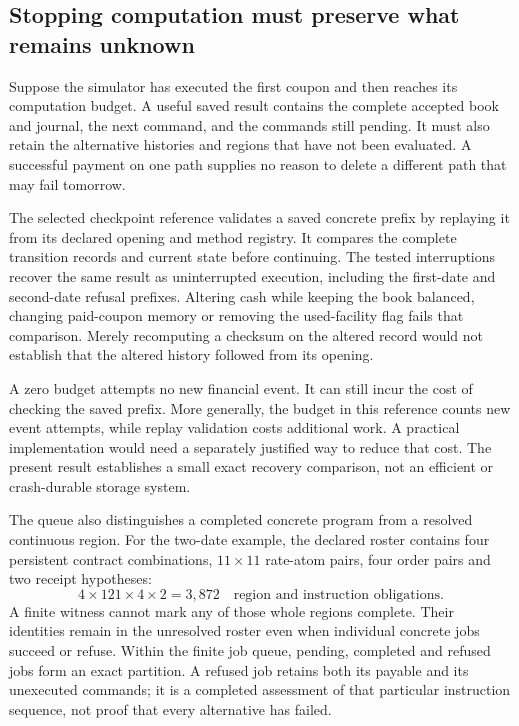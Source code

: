 \subsection{Stopping computation must preserve what remains unknown}

Suppose the simulator has executed the first coupon and then reaches its computation budget. A useful saved result contains the complete accepted book and journal, the next command, and the commands still pending. It must also retain the alternative histories and regions that have not been evaluated. A successful payment on one path supplies no reason to delete a different path that may fail tomorrow.

The selected checkpoint reference validates a saved concrete prefix by replaying it from its declared opening and method registry. It compares the complete transition records and current state before continuing. The tested interruptions recover the same result as uninterrupted execution, including the first-date and second-date refusal prefixes. Altering cash while keeping the book balanced, changing paid-coupon memory or removing the used-facility flag fails that comparison. Merely recomputing a checksum on the altered record would not establish that the altered history followed from its opening.

A zero budget attempts no new financial event. It can still incur the cost of checking the saved prefix. More generally, the budget in this reference counts new event attempts, while replay validation costs additional work. A practical implementation would need a separately justified way to reduce that cost. The present result establishes a small exact recovery comparison, not an efficient or crash-durable storage system.

The queue also distinguishes a completed concrete program from a resolved continuous region. For the two-date example, the declared roster contains four persistent contract combinations, $11\times11$ rate-atom pairs, four order pairs and two receipt hypotheses:
\begin{equation}
 4\times121\times4\times2=3{,}872
 \quad\text{region and instruction obligations}.
\end{equation}
A finite witness cannot mark any of those whole regions complete. Their identities remain in the unresolved roster even when individual concrete jobs succeed or refuse. Within the finite job queue, pending, completed and refused jobs form an exact partition. A refused job retains both its payable and its unexecuted commands; it is a completed assessment of that particular instruction sequence, not proof that every alternative has failed.


